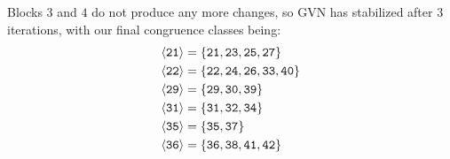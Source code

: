 Blocks $3$ and $4$ do not produce any more changes, so \gls{GVN} has stabilized
after $3$ iterations, with our final congruence classes being:
%
\begin{align*}
  \langle\texttt{21}\rangle &= \{\texttt{21},\texttt{23},\texttt{25},\texttt{27}\}             \\
  \langle\texttt{22}\rangle &= \{\texttt{22},\texttt{24},\texttt{26},\texttt{33},\texttt{40}\} \\
  \langle\texttt{29}\rangle &= \{\texttt{29},\texttt{30},\texttt{39}\}                         \\
  \langle\texttt{31}\rangle &= \{\texttt{31},\texttt{32},\texttt{34}\}                         \\
  \langle\texttt{35}\rangle &= \{\texttt{35},\texttt{37}\}                                     \\
  \langle\texttt{36}\rangle &= \{\texttt{36},\texttt{38},\texttt{41},\texttt{42}\}
\end{align*}
